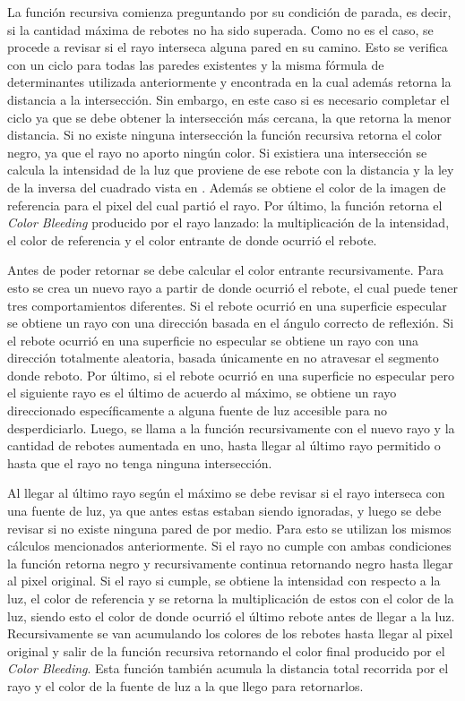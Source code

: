 \documentclass[conference]{IEEEtran}
\begin{document}
La función recursiva comienza preguntando por su condición de parada, es decir, si la cantidad máxima de rebotes no ha sido superada. Como no es el caso, se procede a revisar si el rayo interseca alguna pared en su camino. Esto se verifica con un ciclo para todas las paredes existentes y la misma fórmula de determinantes utilizada anteriormente y encontrada en \cite{b6} la cual además retorna la distancia a la intersección. Sin embargo, en este caso si es necesario completar el ciclo ya que se debe obtener la intersección más cercana, la que retorna la menor distancia. Si no existe ninguna intersección la función recursiva retorna el color negro, ya que el rayo no aporto ningún color. Si existiera una intersección se calcula la intensidad de la luz que proviene de ese rebote con la distancia y la ley de la inversa del cuadrado vista en \cite{b7}. Además se obtiene el color de la imagen de referencia para el pixel del cual partió el rayo. Por último, la función retorna el \textit{Color Bleeding} producido por el rayo lanzado: la multiplicación de la intensidad, el color de referencia y el color entrante de donde ocurrió el rebote.

Antes de poder retornar se debe calcular el color entrante recursivamente. Para esto se crea un nuevo rayo a partir de donde ocurrió el rebote, el cual puede tener tres comportamientos diferentes. Si el rebote ocurrió en una superficie especular se obtiene un rayo con una dirección basada en el ángulo correcto de reflexión. Si el rebote ocurrió en una superficie no especular se obtiene un rayo con una dirección totalmente aleatoria, basada únicamente en no atravesar el segmento donde reboto. Por último, si el rebote ocurrió en una superficie no especular pero el siguiente rayo es el último de acuerdo al máximo, se obtiene un rayo direccionado específicamente a alguna fuente de luz accesible para no desperdiciarlo. Luego, se llama a la función recursivamente con el nuevo rayo y la cantidad de rebotes aumentada en uno, hasta llegar al último rayo permitido o hasta que el rayo no tenga ninguna intersección. 

Al llegar al último rayo según el máximo se debe revisar si el rayo interseca con una fuente de luz, ya que antes estas estaban siendo ignoradas, y luego se debe revisar si no existe ninguna pared de por medio. Para esto se utilizan los mismos cálculos mencionados anteriormente. Si el rayo no cumple con ambas condiciones la función retorna negro y recursivamente continua retornando negro hasta llegar al pixel original. Si el rayo si cumple, se obtiene la intensidad con respecto a la luz, el color de referencia y se retorna la multiplicación de estos con el color de la luz, siendo esto el color de donde ocurrió el último rebote antes de llegar a la luz. Recursivamente se van acumulando los colores de los rebotes hasta llegar al pixel original y salir de la función recursiva retornando el color final producido por el \textit{Color Bleeding}. Esta función también acumula la distancia total recorrida por el rayo y el color de la fuente de luz a la que llego para retornarlos.
\end{document}
